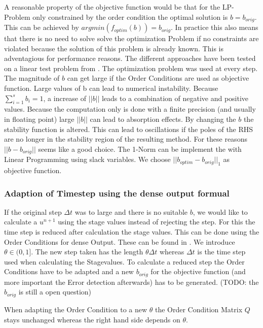 \documentclass{article}
\begin{document}
A reasonable property of the objective function would be that for the LP-Problem only constrained by the order condition the optimal solution is $b = b_{orig}$. 
This can be achieved by $argmin(f_{optim}(b)) = b_{orig}$. 
In practice this also means that there is no need to solve solve the optimization Problem if no constraints are violated because the solution of this problem is already known. This is adventagious for performance reasons.
The different approaches have been tested on a linear test problem from \cite{kopecz_unconditionally_2018}. The optimization problem was used at every step.
The magnitude of $b$ can get large if the Order Conditions are used as objective function.
Large values of b can lead to numerical instability. Because $\sum_{i  = 1}^s b_i = 1$, a increase of $||b||$ leads to a combination of negative and positive values. Because the computation only is done with a finite precision (and usually in floating point) large $||b||$ can lead to absorption effects.    
By changing the $b$ the stability function is altered. This can lead to oscillations if the poles of the RHS are no longer in the stability region of the resulting method.
For these reasons $||b-b_{orig}||$ seems like a good choice. The 1-Norm can be implement the with Linear Programming using slack variables. We choose $||b_{optim}-b_{orig}||_1$ as objective function.




\subsubsection{Adaption of Timestep using the dense output formual}

If the original step $\Delta t$ was to large and there is no suitable $b$, we would like to calculate a $u^{n+1}$ using the stage values instead of rejecting the step. For this the time step is reduced after calculation the stage values. This can be done using the Order Conditions for dense Output. These can be found in \cite{hairer_runge-kutta_1993}.
We introduce $\theta \in (0,1]$. The new step taken has the length $\theta \Delta t$ whereas $\Delta t$ is the time step used when calculating the Stagevalues.
To calculate a reduced step the Order Conditions have to be adapted and a new $b_{orig}$ for the objective function (and more important the Error detection afterwards) has to be generated. 
(TODO: the $b_{orig}$ is still a open question)

When adapting the Order Condition to a new $\theta$ the Order Condition Matrix $Q$ stays unchanged whereas the right hand side depends on $\theta$.
\end{document}
